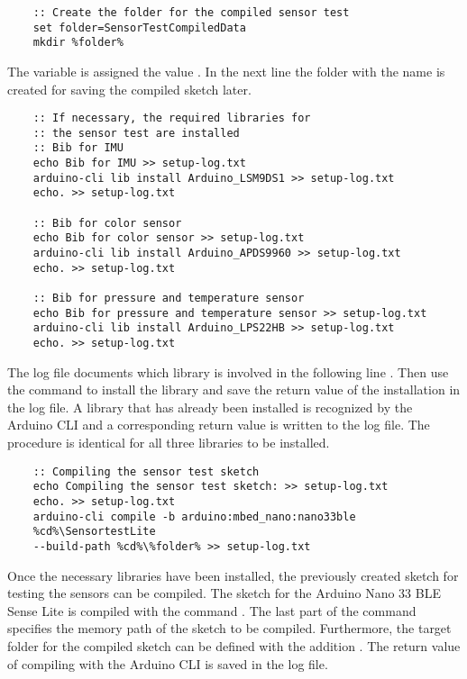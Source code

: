 \begin{lstlisting}
    :: Create the folder for the compiled sensor test
    set folder=SensorTestCompiledData
    mkdir %folder%
\end{lstlisting}
The variable  is assigned the value . In the next line  the folder with the name  is created for saving the compiled sketch later.

\begin{lstlisting}
    :: If necessary, the required libraries for 
    :: the sensor test are installed
    :: Bib for IMU
    echo Bib for IMU >> setup-log.txt
    arduino-cli lib install Arduino_LSM9DS1 >> setup-log.txt
    echo. >> setup-log.txt
    
    :: Bib for color sensor
    echo Bib for color sensor >> setup-log.txt
    arduino-cli lib install Arduino_APDS9960 >> setup-log.txt
    echo. >> setup-log.txt
    
    :: Bib for pressure and temperature sensor
    echo Bib for pressure and temperature sensor >> setup-log.txt
    arduino-cli lib install Arduino_LPS22HB >> setup-log.txt
    echo. >> setup-log.txt
\end{lstlisting}

The log file documents which library is involved in the following line . Then use the command  to install the library and save the return value of the installation in the log file. A library that has already been installed is recognized by the Arduino CLI and a corresponding return value is written to the log file. The procedure is identical for all three libraries to be installed.

\begin{lstlisting}
    :: Compiling the sensor test sketch
    echo Compiling the sensor test sketch: >> setup-log.txt
    echo. >> setup-log.txt
    arduino-cli compile -b arduino:mbed_nano:nano33ble 
    %cd%\SensortestLite 
    --build-path %cd%\%folder% >> setup-log.txt
\end{lstlisting}

Once the necessary libraries have been installed, the previously created sketch for testing the sensors can be compiled. The sketch for the Arduino Nano 33 BLE Sense Lite is compiled with the command . The last part of the command specifies the memory path of the sketch to be compiled. Furthermore, the target folder for the compiled sketch can be defined with the addition . The return value of compiling with the Arduino CLI is saved in the log file.


